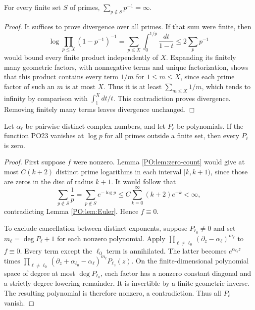 \begin{lemma}\label{PO:lem:Euler}
For every finite set \(S\) of primes,
\(\sum_{p\notin S}p^{-1}=\infty\).
\end{lemma}
\begin{proof}
It suffices to prove divergence over all primes.
If that sum were finite, then
\[
 \log\prod_{p\le X}(1-p^{-1})^{-1}
  =\sum_{p\le X}\int_0^{1/p}\frac{dt}{1-t}
  \le2\sum_p p^{-1}
 \tag{PO25}
\]
would bound every finite product independently of \(X\).
Expanding its finitely many geometric factors, with nonnegative
terms and unique factorization, shows that this product contains
every term \(1/m\) for \(1\le m\le X\), since each prime factor
of such an \(m\) is at most \(X\).
Thus it is at least \(\sum_{m\le X}1/m\), which tends to
infinity by comparison with \(\int_1^X dt/t\).
This contradiction proves divergence. Removing finitely many
terms leaves divergence unchanged.
\end{proof}

\begin{theorem}
\label{PO:thm:prime-uniqueness}
Let \(\alpha_\ell\) be pairwise distinct complex numbers,
and let \(P_\ell\) be polynomials. If the function PO23
vanishes at \(\log p\) for all primes outside a finite set,
then every \(P_\ell\) is zero.
\end{theorem}
\begin{proof}
First suppose \(f\) were nonzero. Lemma \ref{PO:lem:zero-count}
would give at most \(C(k+2)\) distinct prime logarithms in
each interval \([k,k+1)\), since those are zeros in the disc
of radius \(k+1\).
It would follow that
\[
 \sum_{p\notin S}\frac1p
   =\sum_{p\notin S}e^{-\log p}
   \le C\sum_{k=0}^\infty(k+2)e^{-k}<\infty,
 \tag{PO26}
\]
contradicting Lemma \ref{PO:lem:Euler}. Hence \(f\equiv0\).

To exclude cancellation between distinct exponents, suppose
\(P_{\ell_0}\ne0\) and set
\(m_\ell=\deg P_\ell+1\) for each nonzero polynomial.
Apply
\(\prod_{\ell\ne\ell_0}(\partial_z-\alpha_\ell)^{m_\ell}\)
to \(f\equiv0\). Every term except the \(\ell_0\) term is
annihilated. The latter becomes \(e^{\alpha_{\ell_0}z}\)
times
\(\prod_{\ell\ne\ell_0}
  (\partial_z+\alpha_{\ell_0}-\alpha_\ell)^{m_\ell}
    P_{\ell_0}(z)\).
On the finite-dimensional polynomial space of degree at most
\(\deg P_{\ell_0}\), each factor has a nonzero constant
diagonal and a strictly degree-lowering remainder. It is
invertible by a finite geometric inverse. The resulting
polynomial is therefore nonzero, a contradiction.
Thus all \(P_\ell\) vanish.
\end{proof}

